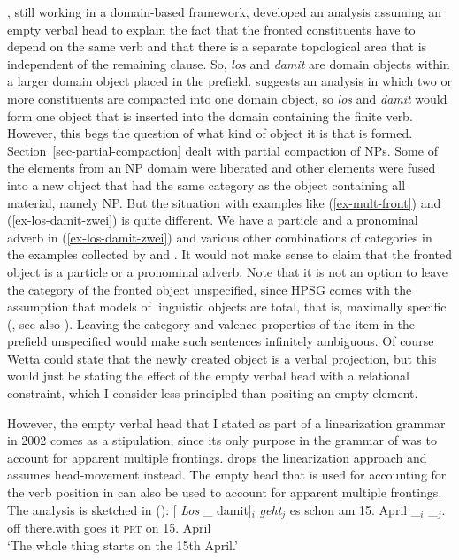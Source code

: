 \documentclass[output=paper,biblatex,babelshorthands,newtxmath,draftmode,colorlinks,citecolor=brown]{langscibook}
\begin{document}
\citet{Mueller2002c}, still working in a domain-based framework, developed an analysis assuming an
empty verbal head to explain the fact that the fronted constituents have to depend on the same verb
and that there is a separate topological area that is independent of the remaining clause. So,
\emph{los} and \emph{damit} are domain objects within a larger domain object placed in the
prefield. \citet{Wetta2011a} suggests an analysis in which two or more constituents are compacted
into one domain object, so \emph{los} and \emph{damit} would form one object that is inserted into
the domain containing the finite verb. However, this begs the question of what kind of object it is
that is formed. Section~\ref{sec-partial-compaction} dealt with partial compaction of NPs. Some of
the elements from an NP domain were liberated and other elements were fused into a new object that
had the same category as the object containing all material, namely NP. But the situation with
examples like (\ref{ex-mult-front}) and (\ref{ex-los-damit-zwei}) is quite different. We have a
particle and a pronominal adverb in (\ref{ex-los-damit-zwei}) and various other combinations of
categories in the examples collected by \citet{Mueller2003b,Mueller2005e,Mueller2013a} and \citet{Bildhauer2011a}. It would
not make sense to claim that the fronted object is a particle or a pronominal adverb. Note that it
is not an option to leave the category of the fronted object unspecified, since HPSG comes with the
assumption that models of linguistic objects are total, that is, maximally specific
(\citealp{King99a-u}, see also ). Leaving the category and
valence properties of the item in the prefield unspecified would make such sentences infinitely
ambiguous. Of course Wetta could state that the newly created object is a verbal projection, but
this would just be stating the effect of the empty verbal head with a relational constraint, which
I consider less principled than positing an empty element.

However, the empty verbal head that I stated as part of a linearization grammar in 2002 comes as a stipulation, since its
only purpose in the grammar of  was to account for apparent multiple
frontings. \citet{Mueller2005d,MuellerGS} drops the linearization approach and assumes head-movement
instead. The empty head that is used for accounting for the verb position in  can also be used
to account for apparent multiple frontings. The analysis is sketched in ():
\eal
\ex
\label{ex-zum-zweiten-anal-zwei}%
\ex
\gll {}[ \emph{Los} \_ damit]$_i$  \emph{geht}$_j$ es schon am 15. April \_$_i$ \_$_j$.\\
     {}          off        {}        there.with   goes it \textsc{prt} on 15. April\\
\glt `The whole thing starts on the 15th April.'
\end{document}
